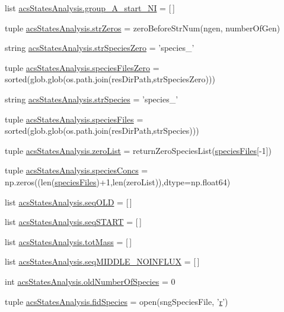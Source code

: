 \begin{DoxyCompactItemize}
list \hyperlink{a00132_aedb746884c5ae6e301c8ad2d8307fe4d}{acs\+States\+Analysis.\+group\+\_\+\+A\+\_\+start\+\_\+\+N\+I} = \mbox{[}$\,$\mbox{]}
\item 
tuple \hyperlink{a00132_a292c23aa303304f24632662a5dfbfa23}{acs\+States\+Analysis.\+str\+Zeros} = zero\+Before\+Str\+Num(ngen, number\+Of\+Gen)
\item 
string \hyperlink{a00132_a52f7239b2be2cb978182547960b6c46e}{acs\+States\+Analysis.\+str\+Species\+Zero} = 'species\+\_\+'
\item 
tuple \hyperlink{a00132_a5584994da277e7798c904342dff18427}{acs\+States\+Analysis.\+species\+Files\+Zero} = sorted(glob.\+glob(os.\+path.\+join(res\+Dir\+Path,str\+Species\+Zero)))
\item 
string \hyperlink{a00132_ab14d209fe558e83aeede3b657a7241bb}{acs\+States\+Analysis.\+str\+Species} = 'species\+\_\+'
\item 
tuple \hyperlink{a00132_af3291bd263282353dd4a12ee38c08cae}{acs\+States\+Analysis.\+species\+Files} = sorted(glob.\+glob(os.\+path.\+join(res\+Dir\+Path,str\+Species)))
\item 
tuple \hyperlink{a00132_ac2f9e6ead14745bd749a1ab8060cd4e7}{acs\+States\+Analysis.\+zero\+List} = return\+Zero\+Species\+List(\hyperlink{a00028_af5703745c2c2a6af7f62da460994d9c2}{species\+Files}\mbox{[}-\/1\mbox{]})
\item 
tuple \hyperlink{a00132_a2377568425051a7511b51f7c50662ba1}{acs\+States\+Analysis.\+species\+Concs} = np.\+zeros((len(\hyperlink{a00028_af5703745c2c2a6af7f62da460994d9c2}{species\+Files})+1,len(zero\+List)),dtype=np.\+float64)
\item 
list \hyperlink{a00132_a55e3b17fd716a4b1e28e7b9d93f1943c}{acs\+States\+Analysis.\+seq\+O\+L\+D} = \mbox{[}$\,$\mbox{]}
\item 
list \hyperlink{a00132_a648282264cfc8a40cf84141f9f59781f}{acs\+States\+Analysis.\+seq\+S\+T\+A\+R\+T} = \mbox{[}$\,$\mbox{]}
\item 
list \hyperlink{a00132_ac2ecae6789d89cc56b0a731065837774}{acs\+States\+Analysis.\+tot\+Mass} = \mbox{[}$\,$\mbox{]}
\item 
list \hyperlink{a00132_a8fd1a0445b2e641363a96da5a7e7159b}{acs\+States\+Analysis.\+seq\+M\+I\+D\+D\+L\+E\+\_\+\+N\+O\+I\+N\+F\+L\+U\+X} = \mbox{[}$\,$\mbox{]}
\item 
int \hyperlink{a00132_abe1ce9bb85ee916d2046efc5c3fe6b30}{acs\+States\+Analysis.\+old\+Number\+Of\+Species} = 0
\item 
tuple \hyperlink{a00132_afd34aa2ef2c410c2d71007bac0a121fd}{acs\+States\+Analysis.\+fid\+Species} = open(sng\+Species\+File, '\hyperlink{a00031_ac862e7284527eb913b1351c8bfb8e079}{r}')

\end{DoxyCompactItemize}
